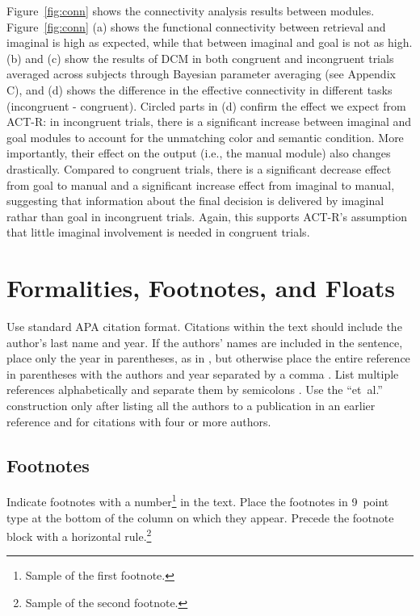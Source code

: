 \documentclass[10pt,letterpaper]{article}
\begin{document}
Figure~\ref{fig:conn} shows the connectivity analysis results between modules. Figure~\ref{fig:conn} (a) shows the functional connectivity between retrieval and imaginal is high as expected, while that between imaginal and goal is not as high. (b) and (c) show the results of DCM in both congruent and incongruent trials averaged across subjects through Bayesian parameter averaging \cite{Kasess2010} (see Appendix C), and (d) shows the difference in the effective connectivity in different tasks (incongruent - congruent). Circled parts in (d) confirm the effect we expect from ACT-R: in incongruent trials, there is a significant increase between imaginal and goal modules to account for the unmatching color and semantic condition. More importantly, their effect on the output (i.e., the manual module) also changes drastically. Compared to congruent trials, there is a significant decrease effect from goal to manual and a significant increase effect from imaginal to manual, suggesting that information about the final decision is delivered by imaginal rathar than goal in incongruent trials. Again, this supports ACT-R's assumption that little imaginal involvement is needed in congruent trials. 



\section{Formalities, Footnotes, and Floats}

Use standard APA citation format. Citations within the text should
include the author's last name and year. If the authors' names are
included in the sentence, place only the year in parentheses, as in
, but otherwise place the entire reference in
parentheses with the authors and year separated by a comma
\cite{NewellSimon1972a}. List multiple references alphabetically and
separate them by semicolons
\cite{ChalnickBillman1988a,NewellSimon1972a}. Use the
``et~al.'' construction only after listing all the authors to a
publication in an earlier reference and for citations with four or
more authors.


\subsection{Footnotes}

Indicate footnotes with a number\footnote{Sample of the first
footnote.} in the text. Place the footnotes in 9~point type at the
bottom of the column on which they appear. Precede the footnote block
with a horizontal rule.\footnote{Sample of the second footnote.}
\end{document}
